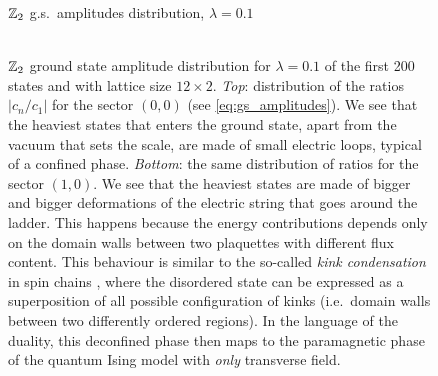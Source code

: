 \begin{figure}[h]
    \centering
    \hspace{3em}$\Z_2$ g.s.~amplitudes distribution, $\lambda=0.1$ \\[5pt]
    \\[-2pt]\hspace{0.4pt}
    
    \caption[$\Z_2$ ground state amplitude distribution for $\lambda = 0.1$]{
        $\Z_2$ ground state amplitude distribution for $\lambda=0.1$ of the first 200 states and with lattice size $12 \times 2$.
        \emph{Top}: distribution of the ratios $|{c_n/c_1}|$ for the sector $(0,0)$ (see \eqref{eq:gs_amplitudes}).
        We see that the heaviest states that enters the ground state, apart from the vacuum that sets the scale, are made of small electric loops, typical of a confined phase.
        \emph{Bottom}: the same distribution of ratios for the sector $(1,0)$.
        We see that the heaviest states are made of bigger and bigger deformations of the electric string that goes around the ladder.
        This happens because the energy contributions depends only on the domain walls between two plaquettes with different flux content.
        This behaviour is similar to the so-called \emph{kink condensation} in spin chains \cite{fradkin1978order}, where the disordered state can be expressed as a superposition of all possible configuration of kinks (i.e.~domain walls between two differently ordered regions).
        In the language of the duality, this deconfined phase then maps to the paramagnetic phase of the quantum Ising model with \emph{only} transverse field.
    }
    \label{fig:gs_ampl_distr_0.1_Z2}
\end{figure}



